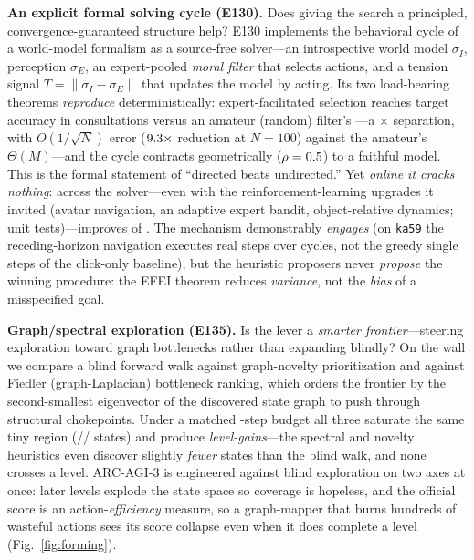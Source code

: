 \documentclass[11pt]{article}
\begin{document}
\textbf{An explicit formal solving cycle (E130).} Does giving the search a principled,
convergence-guaranteed structure help? E130 implements the behavioral cycle of a world-model formalism as
a source-free solver---an introspective world model $\sigma_I$, perception $\sigma_E$, an expert-pooled
\emph{moral filter} that selects actions, and a tension signal $T=\lVert\sigma_I-\sigma_E\rVert$ that
updates the model by acting. Its two load-bearing theorems \emph{reproduce} deterministically:
expert-facilitated selection reaches target accuracy in \ArcShuExpertConsult{} consultations versus an
amateur (random) filter's \ArcShuAmateurTrials{}---a \ArcShuSeparation$\times$ separation, with
$O(1/\sqrt N)$ error ($9.3\times$ reduction at $N{=}100$) against the amateur's
$\Theta(M)$---and the cycle contracts geometrically ($\rho=0.5$) to a faithful model. This is the
formal statement of ``directed beats undirected.'' Yet \emph{online it cracks nothing}: across
\ArcShuOnlineGames{} the solver---even with the reinforcement-learning upgrades it invited (avatar
navigation, an adaptive expert bandit, object-relative dynamics; \ArcShuTests{} unit tests)---improves
\ArcShuOnlineGain{} of \ArcShuOnlineN{}. The mechanism demonstrably \emph{engages} (on \texttt{ka59} the
receding-horizon navigation executes \ArcShuNavSteps{} real steps over \ArcShuNavCycles{} cycles, not the
greedy single steps of the click-only baseline), but the heuristic proposers never \emph{propose} the
winning procedure: the EFEI theorem reduces \emph{variance}, not the \emph{bias} of a misspecified goal.

\textbf{Graph/spectral exploration (E135).} Is the lever a \emph{smarter frontier}---steering exploration
toward graph bottlenecks rather than expanding blindly? On the wall \texttt{\ArcSpectralGame} we compare a
blind forward walk against graph-novelty prioritization and against Fiedler (graph-Laplacian) bottleneck
ranking, which orders the frontier by the second-smallest eigenvector of the discovered state graph to
push through structural chokepoints. Under a matched \ArcSpectralBudget-step budget all three saturate the
same tiny region (\ArcSpectralBlindStates/\ArcSpectralNoveltyStates/\ArcSpectralFiedlerStates{} states)
and produce \emph{\ArcSpectralLevelGains{} level-gains}---the spectral and novelty heuristics even
discover slightly \emph{fewer} states than the blind walk, and none crosses a level. ARC-AGI-3 is
engineered against blind exploration on two axes at once: later levels explode the state space so coverage
is hopeless, and the official score is an action-\emph{efficiency} measure, so a graph-mapper that burns
hundreds of wasteful actions sees its score collapse even when it does complete a level
(Fig.~\ref{fig:forming}).
\end{document}
